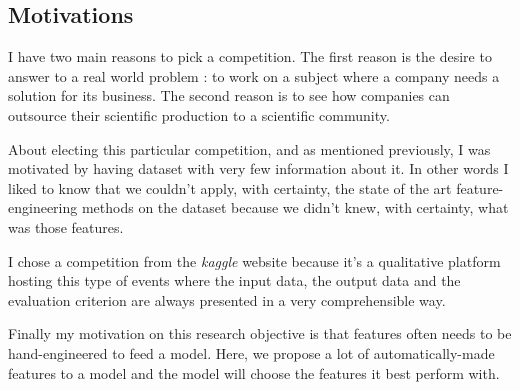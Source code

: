 \documentclass[a4paper]{article}
\begin{document}
	\subsection{Motivations}
		I have two main reasons to pick a competition. The first reason is the desire to answer to a real world problem : to work on a subject where a company needs a solution for its business. The second reason is to see how companies can outsource their scientific production to a scientific community.
		
		About electing this particular competition, and as mentioned previously, I was motivated by having dataset with very few information about it. In other words I liked to know that we couldn't apply, with certainty, the state of the art feature-engineering methods on the dataset because we didn't knew, with certainty, what was those features.

		I chose a competition from the \textit{kaggle} website because it's a qualitative platform hosting this type of events where the input data, the output data and the evaluation criterion are always presented in a very comprehensible way.

		Finally my motivation on this research objective is that features often needs to be hand-engineered to feed a model. Here, we propose a lot of automatically-made features to a model and the model will choose the features it best perform with.











\end{document}
